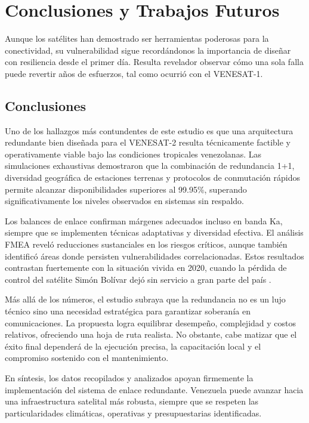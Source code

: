 \section{Conclusiones y Trabajos Futuros}

Aunque los satélites han demostrado ser herramientas poderosas para la conectividad, su vulnerabilidad sigue recordándonos la importancia de diseñar con resiliencia desde el primer día. Resulta revelador observar cómo una sola falla puede revertir años de esfuerzos, tal como ocurrió con el VENESAT-1.

\subsection{Conclusiones}

Uno de los hallazgos más contundentes de este estudio es que una arquitectura redundante bien diseñada para el VENESAT-2 resulta técnicamente factible y operativamente viable bajo las condiciones tropicales venezolanas. Las simulaciones exhaustivas demostraron que la combinación de redundancia 1+1, diversidad geográfica de estaciones terrenas y protocolos de conmutación rápidos permite alcanzar disponibilidades superiores al 99.95\%, superando significativamente los niveles observados en sistemas sin respaldo.

Los balances de enlace confirman márgenes adecuados incluso en banda Ka, siempre que se implementen técnicas adaptativas y diversidad efectiva. El análisis FMEA reveló reducciones sustanciales en los riesgos críticos, aunque también identificó áreas donde persisten vulnerabilidades correlacionadas. Estos resultados contrastan fuertemente con la situación vivida en 2020, cuando la pérdida de control del satélite Simón Bolívar dejó sin servicio a gran parte del país \cite{VenesatStatus2020}.

Más allá de los números, el estudio subraya que la redundancia no es un lujo técnico sino una necesidad estratégica para garantizar soberanía en comunicaciones. La propuesta logra equilibrar desempeño, complejidad y costos relativos, ofreciendo una hoja de ruta realista. No obstante, cabe matizar que el éxito final dependerá de la ejecución precisa, la capacitación local y el compromiso sostenido con el mantenimiento.

En síntesis, los datos recopilados y analizados apoyan firmemente la implementación del sistema de enlace redundante. Venezuela puede avanzar hacia una infraestructura satelital más robusta, siempre que se respeten las particularidades climáticas, operativas y presupuestarias identificadas.

